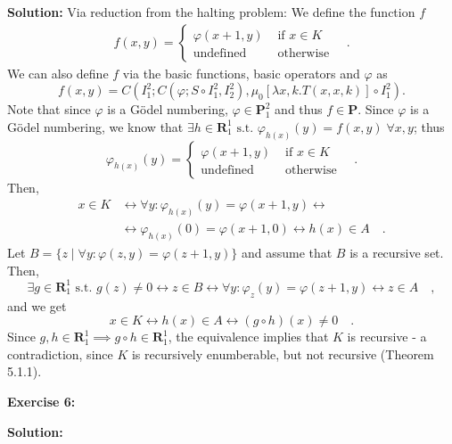 \documentclass [11pt]{article}
\newcommand{\R}{\textbf{R}}
\renewcommand{\P}{\textbf{P}}
\newcommand{\lra}{\ensuremath{\leftrightarrow}}
\begin{document}
\noindent
\textbf{Solution:} 
Via reduction from the halting problem:
We define the function $f$
\begin{align*}
 f(x,y) = \begin{cases}
           \varphi(x+1,y) & \text{ if } x \in K \\
           \text{undefined} & \text{ otherwise} 
          \end{cases} \quad .
\end{align*} 
We can also define $f$ via the basic functions, basic operators and $\varphi$ as
$$
f(x,y) = C(I^2_1; C(\varphi; S \circ I^2_1, I^2_2), \mu_0 [\lambda x,k.T(x,x,k)]\circ I^2_1).
$$
Note that since $\varphi$ is a G\"odel numbering, $\varphi \in \P^2_1$ and thus $f \in \P$.
Since $\varphi$ is a G\"odel numbering, we know that $\exists h \in \R^1_1 \text{ s.t.\ } \varphi_{h(x)}(y) = f(x,y) \;\forall x,y$; thus
$$
\varphi_{h(x)}(y) = \begin{cases}
           \varphi(x+1,y) & \text{ if } x \in K \\
           \text{undefined} & \text{ otherwise}
          \end{cases} \quad.
$$
Then,
\begin{align*}
x \in K &\lra \forall y: \varphi_{h(x)}(y) = \varphi(x+1,y) \lra \\
&\lra \varphi_{h(x)}(0) = \varphi(x+1,0) \lra h(x) \in A \quad . 
\end{align*}
Let $B = \{z \mid \forall y: \varphi(z,y) =  \varphi(z+1,y)\}$ and assume that $B$ is a recursive set.
Then, 
$$
\exists g \in \R^1_1 \text{ s.t.\ } g(z) \neq 0 \lra z \in B \lra \forall y: \varphi_z(y) = \varphi(z+1,y) \lra z \in A \quad ,
$$
and we get 
$$
x \in K \lra h(x) \in A \lra (g \circ h)(x) \neq 0 \quad .
$$
Since $g,h \in \R^1_1 \implies g\circ h \in \R^1_1$, the equivalence implies that $K$ is recursive - a contradiction, since $K$ is recursively enumberable, but not recursive (Theorem 5.1.1).

\bigskip
\noindent
\textbf{Exercise 6:}

\noindent
\textbf{Solution:}
\end{document}
